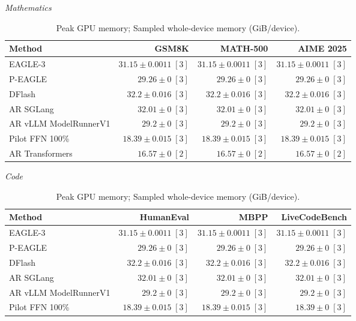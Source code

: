 \begin{table}[!htp]
\centering\small
\setlength{\tabcolsep}{3pt}
\caption{Peak GPU memory; Sampled whole-device memory (GiB/device).}
\label{tab:appendix-metric-memory-sampled-whole-device-memory-none}
\textit{Mathematics}\par\smallskip
\begin{tabular}{@{}>{\raggedright\arraybackslash}p{3.7cm}rrr@{}}
\toprule
Method & GSM8K & MATH-500 & AIME 2025 \\
\midrule
EAGLE-3 & \(31.15 \pm 0.0011\;[3]\) & \(31.15 \pm 0.0011\;[3]\) & \(31.15 \pm 0.0011\;[3]\) \\
P-EAGLE & \(29.26 \pm 0\;[3]\) & \(29.26 \pm 0\;[3]\) & \(29.26 \pm 0\;[3]\) \\
DFlash & \(32.2 \pm 0.016\;[3]\) & \(32.2 \pm 0.016\;[3]\) & \(32.2 \pm 0.016\;[3]\) \\
AR \textperiodcentered{} SGLang & \(32.01 \pm 0\;[3]\) & \(32.01 \pm 0\;[3]\) & \(32.01 \pm 0\;[3]\) \\
AR \textperiodcentered{} vLLM ModelRunnerV1 & \(29.2 \pm 0\;[3]\) & \(29.2 \pm 0\;[3]\) & \(29.2 \pm 0\;[3]\) \\
Pilot FFN 100\% & \(18.39 \pm 0.015\;[3]\) & \(18.39 \pm 0.015\;[3]\) & \(18.39 \pm 0.015\;[3]\) \\
AR \textperiodcentered{} Transformers & \(\mathbf{16.57} \pm 0\;[2]\) & \(\mathbf{16.57} \pm 0\;[2]\) & \(\mathbf{16.57} \pm 0\;[2]\) \\
\bottomrule
\end{tabular}\par\medskip
\textit{Code}\par\smallskip
\begin{tabular}{@{}>{\raggedright\arraybackslash}p{3.7cm}rrr@{}}
\toprule
Method & HumanEval & MBPP & LiveCodeBench \\
\midrule
EAGLE-3 & \(31.15 \pm 0.0011\;[3]\) & \(31.15 \pm 0.0011\;[3]\) & \(31.15 \pm 0.0011\;[3]\) \\
P-EAGLE & \(29.26 \pm 0\;[3]\) & \(29.26 \pm 0\;[3]\) & \(29.26 \pm 0\;[3]\) \\
DFlash & \(32.2 \pm 0.016\;[3]\) & \(32.2 \pm 0.016\;[3]\) & \(32.2 \pm 0.016\;[3]\) \\
AR \textperiodcentered{} SGLang & \(32.01 \pm 0\;[3]\) & \(32.01 \pm 0\;[3]\) & \(32.01 \pm 0\;[3]\) \\
AR \textperiodcentered{} vLLM ModelRunnerV1 & \(29.2 \pm 0\;[3]\) & \(29.2 \pm 0\;[3]\) & \(29.2 \pm 0\;[3]\) \\
Pilot FFN 100\% & \(18.39 \pm 0.015\;[3]\) & \(18.39 \pm 0.015\;[3]\) & \(18.39 \pm 0\;[3]\) \\

\end{tabular}
\end{table}

